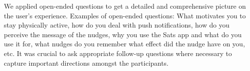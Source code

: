    We applied open-ended questions to get a detailed and comprehensive picture on the user's experience. Examples of open-ended questions: What motivates you to stay physically active, how do you deal with push notifications, how do you perceive the message of the nudges, why you use the Sats app and what do you use it for, what nudges do you remember what effect did the nudge have on you, etc. It was crucial to ask appropriate follow-up questions where necessary to capture important directions amongst the participants.   
\begin{comment}    
\subsection{Participants and Recruitment}
\textbf{Target population and study sample}

\textbf{Sample Size} 
 We were able to conduct 22 interviews, which we considered suitable, as this is an exploratory study of a certain implementation of a digital nudge interface, which aims to investigate users perception and experience. 

\textbf{Sampling technique /Recruitment}
    
    The study is limited to investigating how individuals with ability and motivation for physical activity (apparently), experience and perceive the digital nudges for physical activity. Hence, the sampling was non-randomized.
    
     The recruitment was done by standing at various SATS training centers in Oslo and actively recruiting people for the digital nudge trial / intervention. Information sheets was distributed, and consents where collected. In addition it was made sure that everyone signing up to participate had enabled push notifications through their app. In total, 105 participants registered to be a part of the study. Even though everyone agreed to take part in the following interview, we knew from experience from other research, that the actual participation rate is not very high. For that reason, we wanted to recruit as many participants as possible over a time period. 
        
    As the study followed an exploratory approach, it was also nice to have a good selection of participants, if it should be necessary to group/sort/filter them more.
    
\end{comment} 
 
